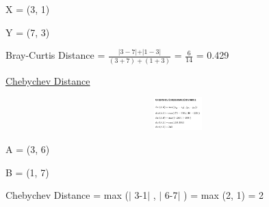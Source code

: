 \documentclass[12pt]{article}
\renewcommand{\_}{\kern-1.5pt\textunderscore\kern-1.5pt}
\begin{document}

\par

{\fontsize{14pt}{16.8pt}\selectfont X = (3, 1)\par}\par

{\fontsize{14pt}{16.8pt}\selectfont Y = (7, 3)\par}\par

{\fontsize{14pt}{16.8pt}\selectfont Bray-Curtis Distance =  \( \frac{ \vert 3-7 \vert + \vert 1-3 \vert }{ \left( 3+7 \right) + \left( 1+3 \right) } \)  =  \( \frac{6}{14} \)  = 0.429\par}\par

{\fontsize{14pt}{16.8pt}\selectfont \uline{Chebychev Distance}\par}\par


\vspace{\baselineskip}



\begin{figure}[H]
	\begin{Center}
		\includegraphics[width=5.13in,height=0.5in]{./media/image10.png}
	\end{Center}
\end{figure}



\par

{\fontsize{14pt}{16.8pt}\selectfont A = (3, 6)\par}\par

{\fontsize{14pt}{16.8pt}\selectfont B = (1, 7)\par}\par

{\fontsize{14pt}{16.8pt}\selectfont Chebychev Distance = max ($ \vert $ 3-1$ \vert $ , $ \vert $ 6-7$ \vert $ ) = max (2, 1) = 2\par}\par
\end{document}
